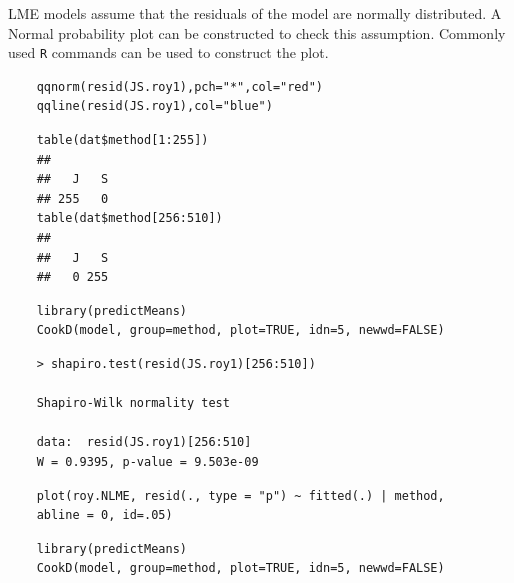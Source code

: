 \documentclass[a4paper,12pt]{article}
\begin{document}
LME models assume that the residuals of the model are normally distributed. A Normal probability plot can be constructed to check this assumption. Commonly used \texttt{R} commands can be used to construct the plot.


\begin{framed}
	\begin{verbatim}
	qqnorm(resid(JS.roy1),pch="*",col="red")
	qqline(resid(JS.roy1),col="blue")
	\end{verbatim}
\end{framed}

\begin{framed}
	\begin{verbatim}
	table(dat$method[1:255])
	## 
	##   J   S 
	## 255   0
	table(dat$method[256:510])
	## 
	##   J   S 
	##   0 255
	\end{verbatim}	
\end{framed}
\begin{framed}
	\begin{verbatim}
	library(predictMeans)
	CookD(model, group=method, plot=TRUE, idn=5, newwd=FALSE)
	\end{verbatim}
\end{framed}






\begin{framed}
	\begin{verbatim}
	> shapiro.test(resid(JS.roy1)[256:510])
	
	Shapiro-Wilk normality test
	
	data:  resid(JS.roy1)[256:510]
	W = 0.9395, p-value = 9.503e-09
	\end{verbatim}
\end{framed}
%		

\begin{framed}
	\begin{verbatim}
	plot(roy.NLME, resid(., type = "p") ~ fitted(.) | method, 
	abline = 0, id=.05)
	\end{verbatim}
\end{framed}

\begin{framed}
	\begin{verbatim}
	library(predictMeans)
	CookD(model, group=method, plot=TRUE, idn=5, newwd=FALSE)
	\end{verbatim}
\end{framed}
\end{document}
